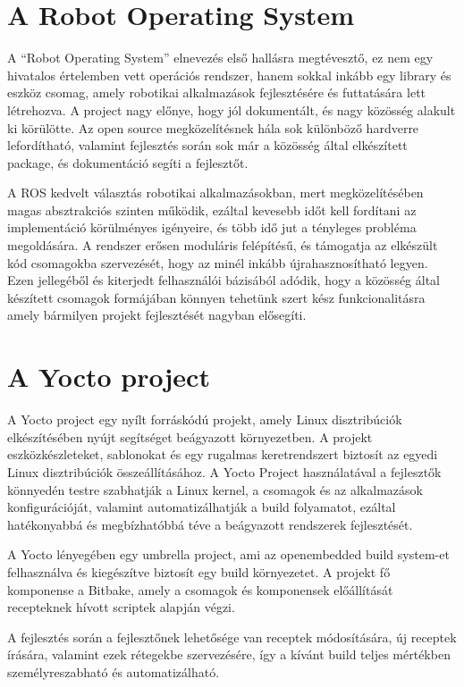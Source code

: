 \section{A Robot Operating System}

A ``Robot Operating System'' elnevezés első hallásra megtévesztő, ez
nem egy hivatalos értelemben vett operációs rendszer, hanem sokkal
inkább egy library és eszköz csomag, amely robotikai alkalmazások
fejlesztésére és futtatására lett létrehozva. A project nagy előnye,
hogy jól dokumentált\cite{doi:10.1126/scirobotics.abm6074}, és nagy
közösség alakult ki körülötte.  Az open source megközelítésnek hála
sok különböző hardverre lefordítható, valamint fejlesztés során sok
már a közösség által elkészített package, és dokumentáció segíti a
fejlesztőt.

A ROS kedvelt választás robotikai alkalmazásokban, mert megközelítésében magas
absztrakciós szinten működik, ezáltal kevesebb időt kell fordítani az
implementáció körülményes igényeire, és több idő jut a tényleges probléma
megoldására. A rendszer erősen moduláris felépítésű, és támogatja az elkészült
kód csomagokba szervezését, hogy az minél inkább újrahasznosítható legyen. Ezen
jellegéből és kiterjedt felhasználói bázisából adódik, hogy a közösség által
készített csomagok formájában könnyen tehetünk szert kész funkcionalitásra amely
bármilyen projekt fejlesztését nagyban elősegíti.

\section{A Yocto project}

A Yocto project egy nyílt forráskódú projekt, amely Linux
disztribúciók elkészítésében nyújt segítséget beágyazott
környezetben\cite{YoctoProjectReference}. A projekt eszközkészleteket,
sablonokat és egy rugalmas keretrendszert biztosít az egyedi Linux
disztribúciók összeállításához. A Yocto Project használatával a
fejlesztők könnyedén testre szabhatják a Linux kernel, a csomagok és
az alkalmazások konfigurációját, valamint automatizálhatják a build
folyamatot, ezáltal hatékonyabbá és megbízhatóbbá téve a beágyazott
rendszerek fejlesztését.

A Yocto lényegében egy umbrella project, ami az openembedded build system-et
felhasználva és kiegészítve biztosít egy build környezetet. A projekt fő
komponense a Bitbake, amely a csomagok és komponensek előállítását recepteknek
hívott scriptek alapján végzi. 

A fejlesztés során a fejlesztőnek lehetősége van receptek módosítására, új
receptek írására, valamint ezek rétegekbe szervezésére, így a kívánt build teljes
mértékben személyreszabható és automatizálható. 

